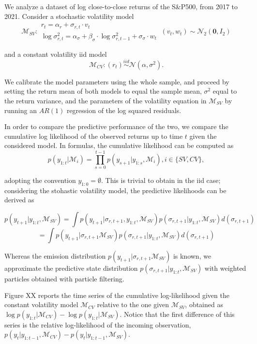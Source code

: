 \documentclass[
]{book}
\theoremstyle{break}
\theoremstyle{nonumberplain}
\begin{document}
We analyze a dataset of log close-to-close returns of the S\&P500, from
2017 to 2021. Consider a stochastic volatility model \[
\mathcal{M}_{SV}:\begin{array}{lc}
r_{t}=\alpha_{r}+\sigma_{r,t}\cdot v_{t}\\
\log\sigma_{r,t}^{2}=\alpha_{\sigma}+\beta_{\sigma}\cdot\log\sigma_{r,t-1}^{2}+\sigma_{\sigma}\cdot w_{t}
\end{array}\ (v_{t},w_{t})\sim\mathcal{N}_{2}(\boldsymbol{0},I_{2})
\]

and a constant volatility iid model \[
\mathcal{M}_{CV}:(r_{t})\overset{iid}{\sim}\mathcal{N}(\alpha,\sigma^{2}).
\]

We calibrate the model parameters using the whole sample, and proceed by
setting the return mean of both models to equal the sample mean,
\(\sigma^{2}\) equal to the return variance, and the parameters of the
volatility equation in \(\mathcal{M}_{SV}\) by running an \(AR(1)\)
regression of the log squared residuals.

In order to compare the predictive performance of the two, we compare
the cumulative log likelihood of the observed returns up to time \(t\)
given the considered model. In formulas, the cumulative likelihood can
be computed as \[
p(y_{1:t}|\mathcal{M}_{i})=\prod_{s=0}^{t-1}p(y_{s+1}|y_{1:s},\mathcal{M}_{i}),i\in\{SV,CV\},
\]

adopting the convention \(y_{1:0}=\emptyset\). This is trivial to obtain
in the iid case; considering the stohastic volatility model, the
predictive likelihoods can be derived as

\[
p(y_{t+1}|y_{1:t},\mathcal{M}_{SV})=\int p(y_{t+1}|\sigma_{r,t+1},y_{1:t},\mathcal{M}_{SV})p(\sigma_{r,t+1}|y_{1:t},\mathcal{M}_{SV})d(\sigma_{r,t+1})
\] \[
=\int p(y_{t+1}|\sigma_{r,t+1}\mathcal{M}_{SV})p(\sigma_{r,t+1}|y_{1:t},\mathcal{M}_{SV})d(\sigma_{r,t+1})
\]

Whereas the emission distribution
\(p(y_{t+1}|\sigma_{r,t+1}\mathcal{M}_{SV})\) is known, we approximate
the predictive state distribution
\(p(\sigma_{r,t+1}|y_{1:t},\mathcal{M}_{SV})\) with weighted particles
obtained with particle filtering.

Figure XX reports the time series of the cumulative log-likelihood given
the constant volatility model \(\mathcal{M}_{CV}\) relative to the one
given \(\mathcal{M}_{SV}\), obtained as
\(\log p(y_{1:t}|\mathcal{M}_{CV})-\log p(y_{1:t}|\mathcal{M}_{SV})\).
Notice that the first difference of this series is the relative
log-likelihood of the incoming observation,
\(p(y_{t}|y_{1:t-1},\mathcal{M}_{CV})-p(y_{t}|y_{1:t-1},\mathcal{M}_{SV})\).
\end{document}
